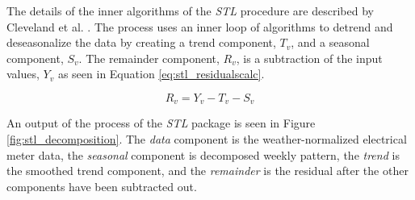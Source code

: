 The details of the inner algorithms of the \emph{STL} procedure are described by Cleveland et al. \cite{cleveland1990stl}. The process uses an inner loop of algorithms to detrend and deseasonalize the data by creating a trend component, $T_v$, and a seasonal component, $S_v$. The remainder component, $R_v$, is a subtraction of the input values, $Y_v$ as seen in Equation \ref{eq:stl_residualscalc}.

\begin{equation}
\label{eq:stl_residualscalc}
R_v = Y_v - T_v - S_v
\end{equation}

 An output of the process of the \emph{STL} package is seen in Figure \ref{fig:stl_decomposition}. The \emph{data} component is the weather-normalized electrical meter data, the \emph{seasonal} component is decomposed weekly pattern, the \emph{trend} is the smoothed trend component, and the \emph{remainder} is the residual after the other components have been subtracted out.
